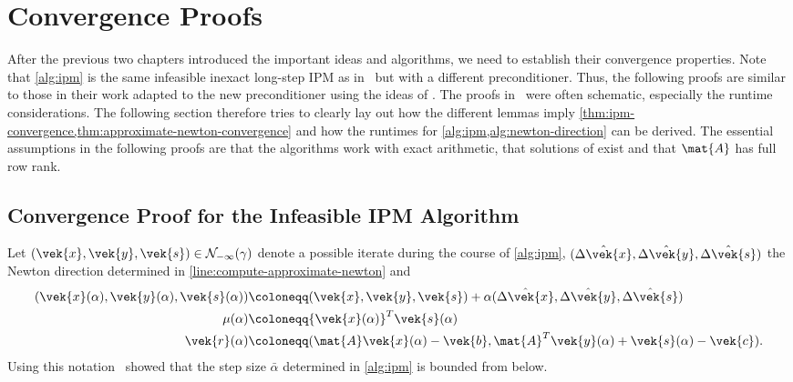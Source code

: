 \chapter{Convergence Proofs}\label{chap:convergence}

After the previous two chapters introduced the important ideas and algorithms, we need to establish their convergence properties.
Note that \cref{alg:ipm} is the same infeasible inexact long-step IPM as in~\cite{Monteiro-ConvergenceAnalysisLongStepInfeasibleIPMs} but with a different preconditioner.
Thus, the following proofs are similar to those in their work adapted to the new preconditioner using the ideas of \textcite{Avron-FasterRandomizedInfeasibleIPMs}.
The proofs in~\cite{Avron-FasterRandomizedInfeasibleIPMs} were often schematic, especially the runtime considerations.
The following section therefore tries to clearly lay out how the different lemmas imply \cref{thm:ipm-convergence,thm:approximate-newton-convergence} and how the runtimes for \cref{alg:ipm,alg:newton-direction} can be derived.
The essential assumptions in the following proofs are that the algorithms work with exact arithmetic, that solutions of  exist and that \(\mat{A}\) has full row rank.

\section{Convergence Proof for the Infeasible IPM Algorithm}

Let \((\vek{x}, \vek{y}, \vek{s}) \in \mathcal{N}_{-\infty}(\gamma)\) denote a possible iterate during the course of \cref{alg:ipm}, \((\hat{\Delta\vek{x}}, \hat{\Delta\vek{y}}, \hat{\Delta\vek{s}})\) the Newton direction determined in \cref{line:compute-approximate-newton} and 
\begin{align}
  (\vek{x}(\alpha), \vek{y}(\alpha), \vek{s}(\alpha)) &\coloneqq (\vek{x}, \vek{y}, \vek{s}) + \alpha (\hat{\Delta\vek{x}}, \hat{\Delta\vek{y}}, \hat{\Delta\vek{s}}) \\
  \mu(\alpha) &\coloneqq {\vek{x}(\alpha)}^T \vek{s}(\alpha) \\
  \vek{r}(\alpha) &\coloneqq (\mat{A}\vek{x}(\alpha) - \vek{b}, \mat{A}^T \vek{y}(\alpha) + \vek{s}(\alpha) - \vek{c}).
\end{align}
Using this notation~\textcite{Monteiro-ConvergenceAnalysisLongStepInfeasibleIPMs} showed that the step size \(\bar{\alpha}\) determined in \cref{alg:ipm} is bounded from below.

